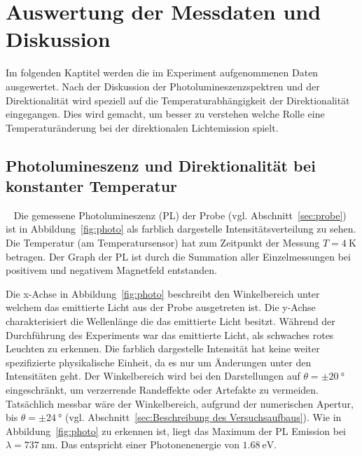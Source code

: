 \chapter{Auswertung der Messdaten und Diskussion}
Im folgenden Kaptitel werden die im Experiment aufgenommenen Daten ausgewertet. 
Nach der Diskussion der Photolumineszenzspektren und der 
Direktionalität wird speziell auf die Temperaturabhängigkeit der 
Direktionalität eingegangen.
Dies wird gemacht, um besser zu verstehen welche Rolle eine Temperaturänderung 
bei der direktionalen Lichtemission spielt.

\section{Photolumineszenz und Direktionalität bei konstanter Temperatur}~\label{sec:PL_u_Direktionalitaet}
Die gemessene Photolumineszenz (PL) der Probe (vgl. Abschnitt~\ref{sec:probe})
ist in Abbildung~\ref{fig:photo} als farblich dargestelle Intensitätsverteilung zu sehen. 
Die Temperatur (am Temperatursensor) hat zum Zeitpunkt der Messung $T = \SI{4}{\kelvin}$ betragen.
Der Graph der PL ist durch die Summation aller Einzelmessungen 
bei positivem und negativem Magnetfeld entstanden. 

Die x-Achse in Abbildung~\ref{fig:photo} beschreibt den Winkelbereich unter welchem das 
emittierte Licht aus der Probe ausgetreten ist.
Die y-Achse charakterisiert die Wellenlänge die das emittierte Licht besitzt. 
Während der Durchführung des Experiments war das emittierte Licht, als schwaches rotes Leuchten zu 
erkennen.
Die farblich dargestelle Intensität hat keine weiter spezifizierte physikalische Einheit, 
da es nur um Änderungen unter den Intensitäten geht.
Der Winkelbereich wird bei den Darstellungen auf $\theta = \pm \SI{20}{\degree}$ 
eingeschränkt, um verzerrende Randeffekte oder Artefakte zu vermeiden. 
Tatsächlich messbar wäre der Winkelbereich, aufgrund der numerischen Apertur, 
bis $\theta = \pm \SI{24}{\degree}$ 
(vgl. Abschnitt~\ref{sec:Beschreibung des Versuchsaufbaus}).
Wie in Abbildung~\ref{fig:photo} zu erkennen ist, 
liegt das Maximum der PL Emission bei $\lambda = \SI{737}{\nano\meter}$.
Das entspricht einer Photonenenergie von $\SI{1,68}{\eV}$.

